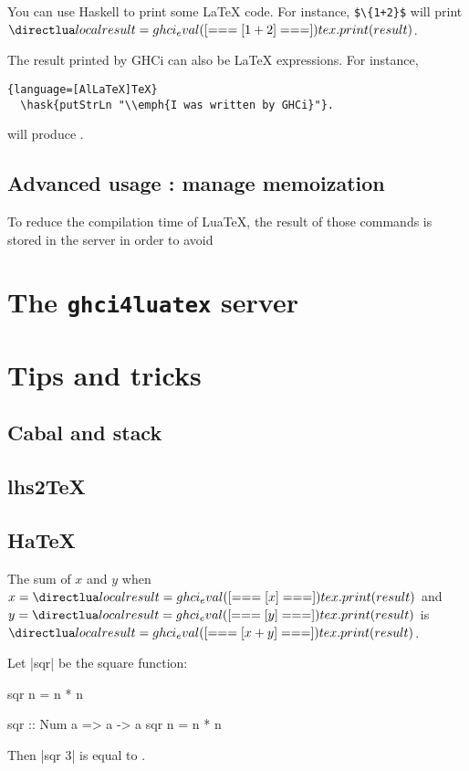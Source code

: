 \documentclass{article}
\begin{document}
You can use Haskell to print some LaTeX code. For instance, \texttt{\$\textbackslash {}\{1+2\}\$} will print $\hask{1 + 2}$.


The result printed by GHCi can also be  LaTeX expressions. For instance,

\begin{lstlisting}{language=[AlLaTeX]TeX}
  \hask{putStrLn "\\emph{I was written by GHCi}"}.
\end{lstlisting}
\noindent
will produce .



\subsection{Advanced usage : manage memoization}

To reduce the compilation time of LuaTeX, the result of those commands is stored in the server in order to avoid

\section{The \texttt{ghci4luatex} server}

\section{Tips and tricks}

\subsection{Cabal and stack}
\subsection{lhs2TeX}
\subsection{HaTeX}

The sum of $x$ and $y$ when $x = \hask{x}$ and $y = \hask{y}$ is $\hask{x + y}$.

Let |sqr| be the square function:

\begin{code}
sqr n = n * n
\end{code}

\begin{ghci}
  sqr :: Num a => a -> a
  sqr n = n * n
\end{ghci}

Then  |sqr 3| is equal to .
\end{document}
